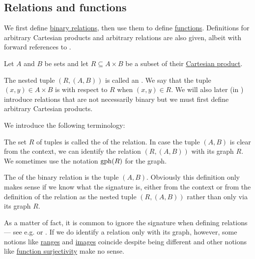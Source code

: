 \subsection{Relations and functions}\label{subsec:relations_and_functions}

We first define \hyperref[def:binary_relation]{binary relations}, then use them to define \hyperref[def:function]{functions}. Definitions for arbitrary Cartesian products and arbitrary relations are also given, albeit with forward references to .

\begin{definition}\label{def:binary_relation}
  Let \( A \) and \( B \) be sets and let \( R \subseteq A \times B \) be a subset of their \hyperref[def:binary_cartesian_product]{Cartesian product}.

  The nested tuple \( (R,  (A, B)) \) is called an . We say that the tuple \( (x, y) \in A \times B \) is  with respect to \( R \) when \( (x, y) \in R \). We will also later (in ) introduce relations that are not necessarily binary but we must first define arbitrary Cartesian products.

  We introduce the following terminology:
  \begin{thmenum}[series=def:binary_relation]
     The set \( R \) of tuples is called the  of the relation. In case the tuple \( (A, B) \) is clear from the context, we can identify the relation \( (R, (A, B)) \) with its graph \( R \). We sometimes use the notation \( \operatorname{gph}(R) \) for the graph.

     The  of the binary relation is the tuple \( (A, B) \). Obviously this definition only makes sense if we know what the signature is, either from the context or from the definition of the relation as the nested tuple \( (R, (A, B)) \) rather than only via its graph \( R \).

    As a matter of fact, it is common to ignore the signature when defining relations --- see e.g. \cite[7]{Kelley1955} or \cite[def. 2.1]{OpenLogicFull}. If we do identify a relation only with its graph, however, some notions like \hyperref[def:binary_relation/range]{ranges} and \hyperref[def:binary_relation/image]{images} coincide despite being different and other notions like \hyperref[def:function_invertibility/surjective]{function surjectivity} make no sense.


\end{thmenum}
\end{definition}
